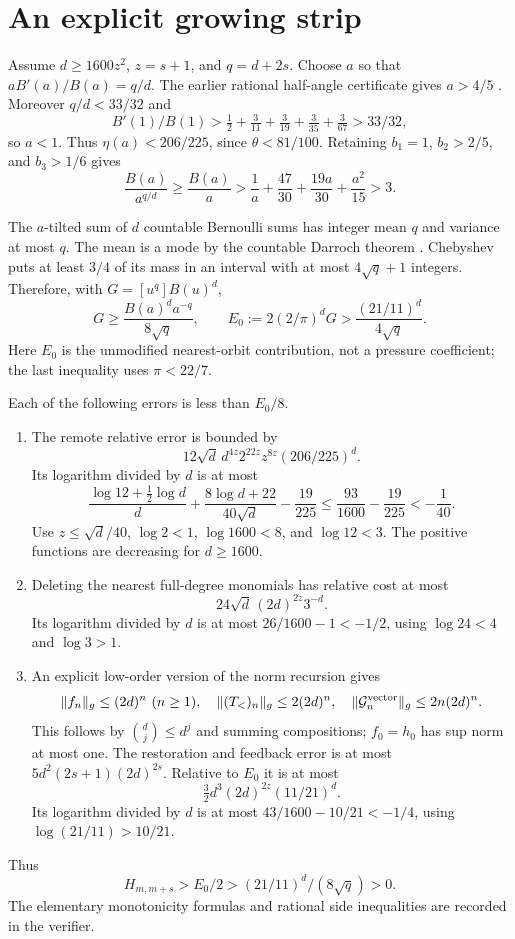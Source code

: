 \documentclass[11pt,a4paper]{article}
\theoremstyle{remark}\newtheorem*{ednote}{Editorial note (ProveIt, 2026-10-01)}
\begin{document}
\section{An explicit growing strip}
Assume $d\ge1600z^2$, $z=s+1$, and $q=d+2s$. Choose $a$ so that $aB'(a)/B(a)=q/d$. The earlier rational half-angle certificate gives $a>4/5$ \cite{boundary}. Moreover $q/d<33/32$ and
\[
B'(1)/B(1)>\tfrac12+\tfrac3{11}+\tfrac3{19}+\tfrac3{35}+\tfrac3{67}>33/32,
\]
so $a<1$. Thus $\eta(a)<206/225$, since $\theta<81/100$. Retaining $b_1=1$, $b_2>2/5$, and $b_3>1/6$ gives
\[
\frac{B(a)}{a^{q/d}}\ge\frac{B(a)}a>
\frac1a+\frac{47}{30}+\frac{19a}{30}+\frac{a^2}{15}>3.
\]

The $a$-tilted sum of $d$ countable Bernoulli sums has integer mean $q$ and variance at most $q$. The mean is a mode by the countable Darroch theorem \cite[Theorem 2]{gnedin}. Chebyshev puts at least $3/4$ of its mass in an interval with at most $4\sqrt q+1$ integers. Therefore, with $G=[u^q]B(u)^d$,
\[
G\ge\frac{B(a)^da^{-q}}{8\sqrt q},\qquad
E_0:=2(2/\pi)^dG>\frac{(21/11)^d}{4\sqrt q}.
\]
Here $E_0$ is the unmodified nearest-orbit contribution, not a pressure coefficient; the last inequality uses $\pi<22/7$.

Each of the following errors is less than $E_0/8$.
\begin{enumerate}
\item The remote relative error is bounded by
\[
12\sqrt d\,d^{4z}2^{22z}z^{8z}(206/225)^d.
\]
Its logarithm divided by $d$ is at most
\[
\frac{\log12+\tfrac12\log d}{d}+
\frac{8\log d+22}{40\sqrt d}-\frac{19}{225}
\le\frac{93}{1600}-\frac{19}{225}<-\frac1{40}.
\]
Use $z\le\sqrt d/40$, $\log2<1$, $\log1600<8$, and $\log12<3$. The positive functions are decreasing for $d\ge1600$.
\item Deleting the nearest full-degree monomials has relative cost at most
\[
24\sqrt d\,(2d)^{2z}3^{-d}.
\]
Its logarithm divided by $d$ is at most $26/1600-1<-1/2$, using $\log24<4$ and $\log3>1$.
\item An explicit low-order version of the norm recursion gives
\[
\|f_n\|_g\le(2d)^n\ (n\ge1),\quad
\|(T_{<})_n\|_g\le2(2d)^n,\quad
\|\mathcal G_n^{\rm vector}\|_g\le2n(2d)^n.
\]
This follows by $\binom dj\le d^j$ and summing compositions; $f_0=h_0$ has sup norm at most one. The restoration and feedback error is at most $5d^2(2s+1)(2d)^{2s}$. Relative to $E_0$ it is at most
\[
\tfrac32d^3(2d)^{2z}(11/21)^d.
\]
Its logarithm divided by $d$ is at most $43/1600-10/21<-1/4$, using $\log(21/11)>10/21$.
\end{enumerate}
Thus
\begin{equation}\label{eq:explicitlower}
H_{m,m+s}>E_0/2>(21/11)^d/(8\sqrt q)>0.
\end{equation}
The elementary monotonicity formulas and rational side inequalities are recorded in the verifier.
\end{document}
